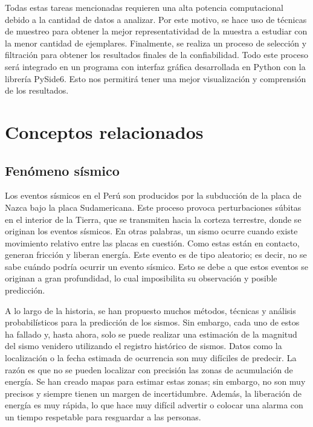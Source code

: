 Todas estas tareas mencionadas requieren una alta potencia computacional debido a la cantidad de datos a analizar. Por este motivo, se hace uso de técnicas de muestreo para obtener la mejor representatividad de la muestra a estudiar con la menor cantidad de ejemplares. Finalmente, se realiza un proceso de selección y filtración para obtener los resultados finales de la confiabilidad. Todo este proceso será integrado en un programa con interfaz gráfica desarrollada en Python con la librería PySide6. Esto nos permitirá tener una mejor visualización y comprensión de los resultados.

\section{Conceptos relacionados}
\subsection{Fenómeno sísmico}
Los eventos sísmicos en el Perú son producidos por la subducción de la placa de Nazca bajo la placa Sudamericana. Este proceso provoca perturbaciones súbitas en el interior de la Tierra, que se transmiten hacia la corteza terrestre, donde se originan los eventos sísmicos. En otras palabras, un sismo ocurre cuando existe movimiento relativo entre las placas en cuestión. Como estas están en contacto, generan fricción y liberan energía. Este evento es de tipo aleatorio; es decir, no se sabe cuándo podría ocurrir un evento sísmico. Esto se debe a que estos eventos se originan a gran profundidad, lo cual imposibilita su observación y posible predicción.

A lo largo de la historia, se han propuesto muchos métodos, técnicas y análisis probabilísticos para la predicción de los sismos. Sin embargo, cada uno de estos ha fallado y, hasta ahora, solo se puede realizar una estimación de la magnitud del sismo venidero utilizando el registro histórico de sismos. Datos como la localización o la fecha estimada de ocurrencia son muy difíciles de predecir. La razón es que no se pueden localizar con precisión las zonas de acumulación de energía. Se han creado mapas para estimar estas zonas; sin embargo, no son muy precisos y siempre tienen un margen de incertidumbre. Además, la liberación de energía es muy rápida, lo que hace muy difícil advertir o colocar una alarma con un tiempo respetable para resguardar a las personas.

